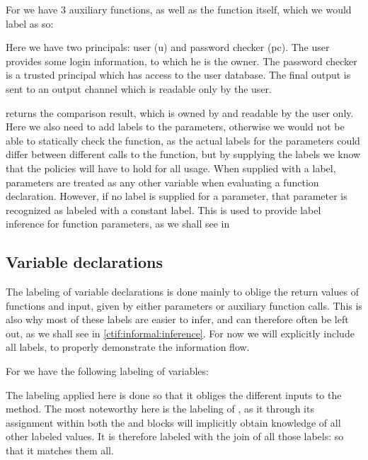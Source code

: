 For  we have 3 auxiliary functions, as well as the  function itself, which we would label as so:
\begin{center}

\end{center}

Here we have two principals: user (u) and password checker (pc).
The user provides some login information, to which he is the owner.
The password checker is a trusted principal which has access to the user database.
The final output is sent to an output channel which is readable only by the user.

 returns the comparison result, which is owned by and readable by the user only.
Here we also need to add labels to the parameters, otherwise we would not be able to statically check the function, as the actual labels for the parameters could differ between different calls to the function, but by supplying the labels we know that the policies will have to hold for all usage.
When supplied with a label, parameters are treated as any other variable when evaluating a function declaration.
However, if no label is supplied for a parameter, that parameter is recognized as labeled with a constant label.
This is used to provide label inference for function parameters, as we shall see in

\subsection{Variable declarations}
The labeling of variable declarations is done mainly to oblige the return values of functions and input, given by either parameters or auxiliary function calls.
This is also why most of these labels are easier to infer, and can therefore often be left out, as we shall see in \cref{ctif:informal:inference}.
For now we will explicitly include all labels, to properly demonstrate the information flow.

For  we have the following labeling of variables:
\begin{center}

\end{center}

The labeling applied here is done so that it obliges the different inputs to the method.
The most noteworthy here is the labeling of , as it through its assignment within both the  and  blocks will implicitly obtain knowledge of all other labeled values.
It is therefore labeled with the join of all those labels:  so that it matches them all.

